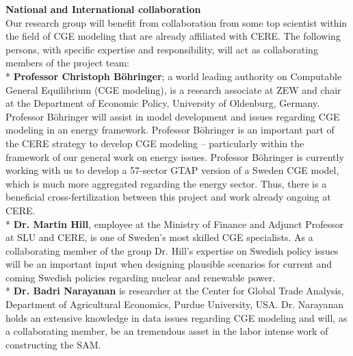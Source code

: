 \textbf{National and International collaboration}\\
Our research group will benefit from collaboration from some top scientist within the field of CGE modeling that are already affiliated with CERE. The following persons, with specific expertise and responsibility, will act as collaborating members of the project team:\\*
\textbf{Professor Christoph Böhringer}; a world leading authority on Computable General Equilibrium (CGE modeling), is a research associate at ZEW and chair at the Department of Economic Policy, University of Oldenburg, Germany. Professor Böhringer will assist in model development and issues regarding CGE modeling in an energy framework. Professor Böhringer is an important part of the CERE strategy to develop CGE modeling – particularly within the framework of our general work on energy issues. Professor Böhringer is currently working with us to develop a 57-sector GTAP version of a Sweden CGE model, which is much more aggregated regarding the energy sector. Thus, there is a beneficial cross-fertilization between this project and work already ongoing at CERE.\\*
\textbf{Dr. Martin Hill}, employee at the Ministry of Finance and Adjunct Professor at SLU and CERE, is one of Sweden's most skilled CGE specialists. As a collaborating member of the group Dr. Hill’s expertise on Swedish policy issues will be an important input when designing plausible scenarios for current and coming Swedish policies regarding nuclear and renewable power.\\*
\textbf{Dr. Badri Narayanan} is researcher at the Center for Global Trade Analysis, Department of Agricultural Economics, Purdue University, USA. Dr. Narayanan holds an extensive knowledge in data issues regarding CGE modeling and will, as a collaborating member, be an tremendous asset in the labor intense work of constructing the SAM.
